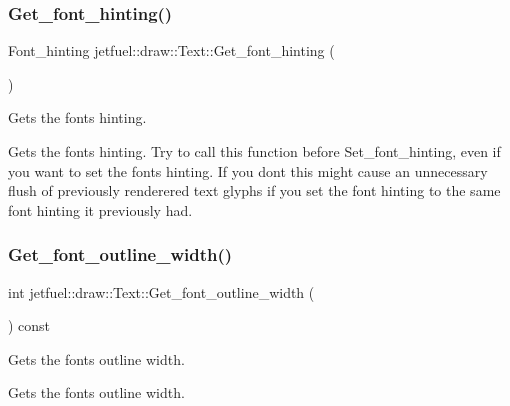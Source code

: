 \subsubsection{\texorpdfstring{Get\+\_\+font\+\_\+hinting()}{Get\_font\_hinting()}}
{\footnotesize\ttfamily Font\+\_\+hinting jetfuel\+::draw\+::\+Text\+::\+Get\+\_\+font\+\_\+hinting (\begin{DoxyParamCaption}{ }\end{DoxyParamCaption})\hspace{0.3cm}{\ttfamily [inline]}}



Gets the font\textquotesingle{}s hinting. 

Gets the font\textquotesingle{}s hinting. Try to call this function before Set\+\_\+font\+\_\+hinting, even if you want to set the font\textquotesingle{}s hinting. If you don\textquotesingle{}t this might cause an unnecessary flush of previously renderered text glyphs if you set the font hinting to the same font hinting it previously had. \mbox{\label{classjetfuel_1_1draw_1_1Text_a7d5f85f555e61f47a5a418399ba8e72b}} 
\subsubsection{\texorpdfstring{Get\+\_\+font\+\_\+outline\+\_\+width()}{Get\_font\_outline\_width()}}
{\footnotesize\ttfamily int jetfuel\+::draw\+::\+Text\+::\+Get\+\_\+font\+\_\+outline\+\_\+width (\begin{DoxyParamCaption}{ }\end{DoxyParamCaption}) const\hspace{0.3cm}{\ttfamily [inline]}}



Gets the font\textquotesingle{}s outline width. 

Gets the font\textquotesingle{}s outline width. \mbox{\label{classjetfuel_1_1draw_1_1Text_aeb691f0eb368473f5691895212daf431}} 
